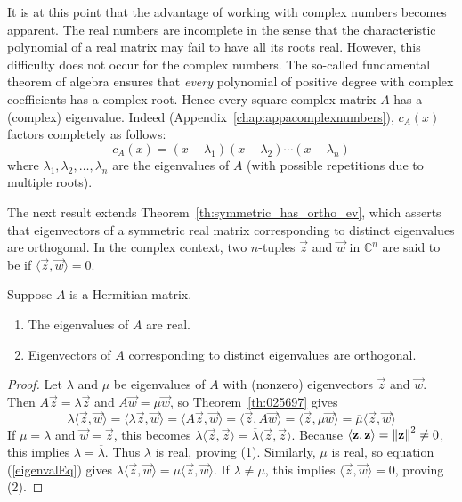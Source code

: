 \documentclass{ximera}
\begin{document}
It is at this point that the advantage
of working with complex numbers becomes apparent. The real numbers are
incomplete in the sense that the characteristic polynomial of a real
matrix may fail to have all its roots real. However, this difficulty
does not occur for the complex numbers. The so-called fundamental
theorem of algebra ensures that \textit{every} polynomial of positive degree with complex coefficients has a complex root. Hence every square complex matrix $A$ has a (complex) eigenvalue. Indeed (Appendix~\ref{chap:appacomplexnumbers}), $c_{A}(x)$ factors completely as follows:
\begin{equation*}
c_{A}(x) = (x -\lambda_{1})(x -\lambda_{2}) \cdots (x -\lambda_{n})
\end{equation*}
where $\lambda_{1}, \lambda_{2}, \ldots, \lambda_{n}$ are the eigenvalues of $A$ (with possible repetitions due to multiple roots).

The next result extends Theorem~\ref{th:symmetric_has_ortho_ev},
 which asserts that eigenvectors of a symmetric real matrix
corresponding to distinct eigenvalues are orthogonal. In the
complex context, two $n$-tuples $\vec{z}$ and $\vec{w}$ in $\mathbb{C}^n$ are said to be  if $\langle \vec{z}, \vec{w} \rangle = 0$.

\begin{theorem}\label{th:025729}
Suppose $A$ is a Hermitian matrix.

\begin{enumerate}
\item\label{th:025729a} The eigenvalues of $A$ are real.

\item\label{th:025729b} Eigenvectors of $A$ corresponding to distinct eigenvalues are orthogonal.

\end{enumerate}
\end{theorem}

\begin{proof}
Let $\lambda$ and $\mu$ be eigenvalues of $A$ with (nonzero) eigenvectors $\vec{z}$ and $\vec{w}$. Then $A\vec{z} = \lambda \vec{z}$ and $A\vec{w} = \mu \vec{w}$, so Theorem~\ref{th:025697} gives
\begin{equation} \label{eigenvalEq}
\lambda \langle \vec{z}, \vec{w} \rangle = \langle \lambda \vec{z}, \vec{w} \rangle = \langle A\vec{z}, \vec{w} \rangle = \langle \vec{z}, A\vec{w} \rangle = \langle \vec{z}, \mu \vec{w} \rangle = \overline{\mu} \langle \vec{z}, \vec{w} \rangle
\end{equation}
If $\mu = \lambda$ and $\vec{w} = \vec{z}$, this becomes $\lambda \langle \vec{z}, \vec{z} \rangle  = \overline{\lambda} \langle \vec{z}, \vec{z} \rangle$. Because $\langle \mathbf{z}, \mathbf{z} \rangle = \left\lVert\mathbf{z}\right\rVert^{2} \neq 0$, this implies $\lambda = \overline{\lambda}$. Thus $\lambda$ is real, proving (1). Similarly, $\mu$ is real, so equation (\ref{eigenvalEq}) gives $\lambda \langle \vec{z}, \vec{w} \rangle = \mu \langle \vec{z}, \vec{w} \rangle$. If $\lambda \neq \mu$, this implies $\langle \vec{z}, \vec{w} \rangle = 0$, proving (2).
\end{proof}
\end{document}
